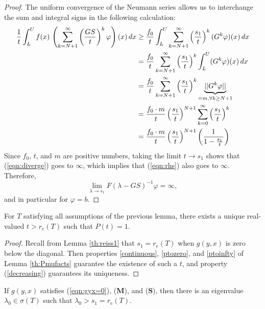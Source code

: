 \begin{proof}
	The uniform convergence of the Neumann series allows us to interchange the sum and integral signs in the following calculation:
	\begin{align}
		\frac{1}{t} \int_L^U f(x) \, \left( \sum_{k=N+1}^\infty \left( \frac{GS}{t} \right)^k \varphi \right)(x) \, dx &\geq \frac{f_0}{t} \int_L^U  \sum_{k=N+1}^\infty \left( \frac{s_1}{t} \right)^k (G^k\varphi)(x) \, dx \notag \\
		&= \frac{f_0}{t}\sum_{k=N+1}^\infty \left( \frac{s_1}{t} \right)^k \int_L^U (G^k\varphi)(x) \, dx \notag \\
		&= \frac{f_0}{t} \sum_{k=N+1}^\infty \left( \frac{s_1}{t} \right)^k \underbrace{||G^k \varphi||}_{=m, \forall k \geq N +1} \notag \\
		&= \frac{f_0 \cdot m}{t} \left(\frac{s_1}{t}\right)^{N+1} \sum_{k=0}^\infty \left( \frac{s_1}{t} \right)^k \notag \\
		&= \frac{f_0 \cdot m}{t} \left(\frac{s_1}{t}\right)^{N+1} \left( \frac{1}{1-\frac{s_1}{t}} \right) \label{eqn:diverge}
	\end{align}
	Since $f_0$, $t$, and $m$ are positive numbers, taking the limit $t \to s_1$ shows that  (\ref{eqn:diverge}) goes to $\infty$, which implies that (\ref{eqn:rhs}) also goes to $\infty$. Therefore, 
	\[\lim_{\lambda \to s_1} F(\lambda-GS)^{-1} \varphi = \infty,\]
	and in particular for $\varphi = b$.
	
\end{proof}

\begin{corollary} \label{th:Pis1}
	For $T$ satisfying all assumptions of the previous lemma, there exists a unique real-valued $t > r_e(T)$ such that $P(t) = 1$.
\end{corollary}

\begin{proof}
	Recall from Lemma \ref{th:reiss1} that $s_1 = r_e(T)$ when $g(y,x)$ is zero below the diagonal. Then properties \eqref{continuous}, \eqref{ptozero}, and \eqref{ptoinfty} of Lemma \ref{th:Pmufacts} guarantee the existence of such a $t$, and property (\ref{decreasing}) guarantees its uniqueness.
	
\end{proof}

\begin{lemma} \label{th:thereisamu}
	If $g(y, x)$ satisfies (\ref{eqn:gyx=0}), (\textbf{M}), and (\textbf{S}), then there is an eigenvalue $\lambda_0 \in \sigma(T)$ such that $\lambda_0 > s_1 = r_e(T)$.
\end{lemma}


